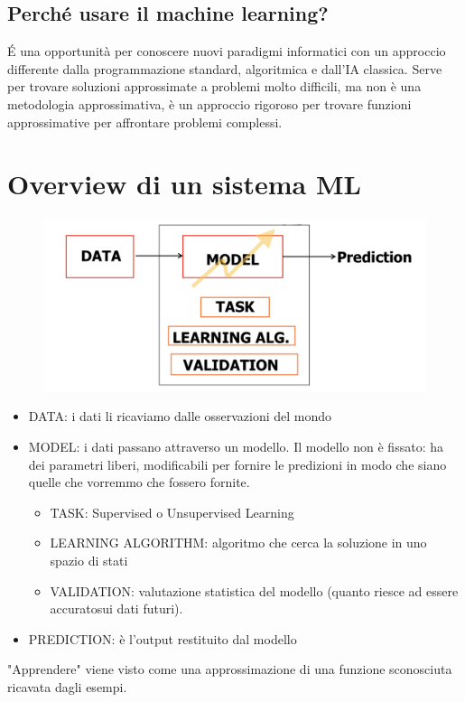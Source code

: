 \documentclass{article}
\begin{document}
\subsection{Perché usare il machine learning?}
É una opportunità per conoscere nuovi paradigmi informatici con un approccio differente dalla programmazione standard, algoritmica e dall'IA classica. Serve per trovare soluzioni approssimate a problemi molto difficili, ma non è una metodologia approssimativa, è un approccio rigoroso per trovare funzioni approssimative per affrontare problemi complessi. 

\section{Overview di un sistema ML}
\begin{figure}[H]
    \centering
    \includegraphics[scale=0.5]{Images/modelloML.png}
\end{figure}

\begin{itemize}
    \item DATA: i dati li ricaviamo dalle osservazioni del mondo
    \item MODEL: i dati passano attraverso un modello. Il modello non è fissato: ha dei parametri liberi, modificabili per fornire le predizioni in modo che siano quelle che vorremmo che fossero fornite.
    \begin{itemize}
        \item TASK: Supervised o Unsupervised Learning
        \item LEARNING ALGORITHM: algoritmo che cerca la soluzione in uno spazio di stati
        \item VALIDATION: valutazione statistica del modello (quanto riesce ad essere accuratosui dati futuri). 
    \end{itemize}
    \item PREDICTION: è l'output restituito dal modello
\end{itemize} 
"Apprendere" viene visto come una approssimazione di una funzione sconosciuta ricavata dagli esempi. 
\end{document}
